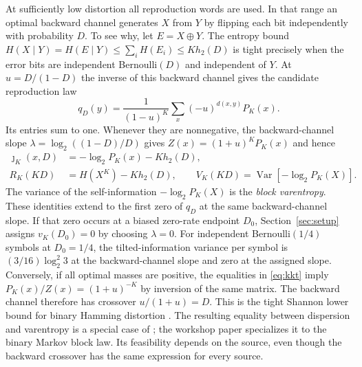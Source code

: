 \documentclass[11pt,letterpaper]{article}
\theoremstyle{definition}
\newcommand{\Var}{\operatorname{Var}}
\newcommand{\jj}{\jmath}
\newcommand{\hx}{h_2}
\begin{document}
At sufficiently low distortion all reproduction words are used. In that range an optimal backward channel generates $X$ from $Y$ by flipping each bit independently with probability $D$. To see why, let $E=X\oplus Y$. The entropy bound $H(X\mid Y)=H(E\mid Y)\le\sum_i H(E_i)\le K\hx(D)$ is tight precisely when the error bits are independent Bernoulli$(D)$ and independent of $Y$. At $u=D/(1-D)$ the inverse of this backward channel gives the candidate reproduction law
\begin{equation}
 q_D(y)=\frac{1}{(1-u)^K}\sum_x(-u)^{d(x,y)}P_K(x).              \label{eq:inverse}
\end{equation}
Its entries sum to one. Whenever they are nonnegative, the backward-channel slope $\lambda=\log_2((1-D)/D)$ gives $Z(x)=(1+u)^K P_K(x)$ and hence
\begin{equation}
 \begin{aligned}
 \jj_K(x,D)&=-\log_2P_K(x)-K\hx(D),\\
 R_K(KD)&=H(X^K)-K\hx(D),\qquad V_K(KD)=\Var[-\log_2P_K(X)] .
 \end{aligned}                                                   \label{eq:slb}
\end{equation}
The variance of the self-information $-\log_2 P_K(X)$ is the \emph{block varentropy}. These identities extend to the first zero of $q_D$ at the same backward-channel slope. If that zero occurs at a biased zero-rate endpoint $D_0$, Section~\ref{sec:setup} assigns $v_K(D_0)=0$ by choosing $\lambda=0$. For independent Bernoulli$(1/4)$ symbols at $D_0=1/4$, the tilted-information variance per symbol is $(3/16)\log_2^2 3$ at the backward-channel slope and zero at the assigned slope. Conversely, if all optimal masses are positive, the equalities in \eqref{eq:kkt} imply $P_K(x)/Z(x)=(1+u)^{-K}$ by inversion of the same matrix. The backward channel therefore has crossover $u/(1+u)=D$. This is the tight Shannon lower bound for binary Hamming distortion \cite{berger71,gray70}. The resulting equality between dispersion and varentropy is a special case of \cite{kostina17}; the workshop paper \cite{itw} specializes it to the binary Markov block law. Its feasibility depends on the source, even though the backward crossover has the same expression for every source.
\end{document}

